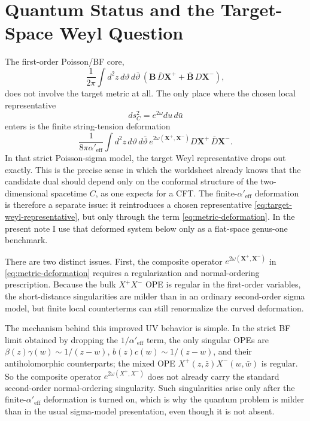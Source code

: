 \documentclass[11pt]{article}
\newcommand{\Aeff}{\alpha'_{\mathrm{eff}}}
\begin{document}
\section{Quantum Status and the Target-Space Weyl Question}
The first-order Poisson/BF core,
\begin{equation}\label{eq:bf-core}
\frac{1}{2\pi}\int d^2z\,d\vartheta\,d\bar\vartheta\,
\left(
\mathbf B\,\bar D\mathbf X^+
+\bar{\mathbf B}\,D\mathbf X^-
\right),
\end{equation}
does not involve the target metric at all. The only place where the chosen local representative
\begin{equation}\label{eq:target-weyl-representative}
ds_C^2=e^{2\omega}du\,d\bar u
\end{equation}
enters is the finite string-tension deformation
\begin{equation}\label{eq:metric-deformation}
\frac{1}{8\pi \Aeff}\int d^2z\,d\vartheta\,d\bar\vartheta\,
e^{2\omega(\mathbf X^+,\mathbf X^-)}D\mathbf X^+\,\bar D\mathbf X^-.
\end{equation}
In that strict Poisson-sigma model, the target Weyl representative drops out exactly. This is the precise sense in which the worldsheet already knows that the candidate dual should depend only on the conformal structure of the two-dimensional spacetime $C$, as one expects for a CFT. The finite-$\Aeff$ deformation is therefore a separate issue: it reintroduces a chosen representative \eqref{eq:target-weyl-representative}, but only through the term \eqref{eq:metric-deformation}. In the present note I use that deformed system below only as a flat-space genus-one benchmark.

There are two distinct issues. First, the composite operator $e^{2\omega(\mathbf X^+,\mathbf X^-)}$ in \eqref{eq:metric-deformation} requires a regularization and normal-ordering prescription. Because the bulk $X^+X^-$ OPE is regular in the first-order variables, the short-distance singularities are milder than in an ordinary second-order sigma model, but finite local counterterms can still renormalize the curved deformation.

The mechanism behind this improved UV behavior is simple. In the strict BF limit obtained by dropping the $1/\Aeff$ term, the only singular OPEs are $\beta(z)\gamma(w)\sim 1/(z-w)$, $b(z)c(w)\sim 1/(z-w)$, and their antiholomorphic counterparts; the mixed OPE $X^+(z,\bar z)X^-(w,\bar w)$ is regular. So the composite operator $e^{2\omega(X^+,X^-)}$ does not already carry the standard second-order normal-ordering singularity. Such singularities arise only after the finite-$\Aeff$ deformation is turned on, which is why the quantum problem is milder than in the usual sigma-model presentation, even though it is not absent.
\end{document}
